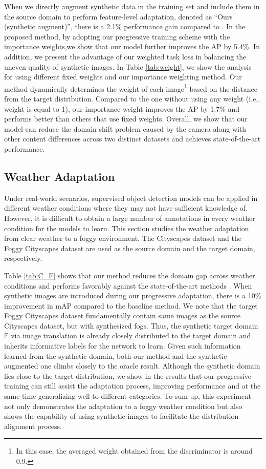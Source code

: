\documentclass[10pt,twocolumn,letterpaper]{article}
\begin{document}
When we directly augment synthetic data in the training set and include them in the source domain to perform feature-level adaptation, denoted as ``Ours (synthetic augment)'', there is a 2.1\% performance gain compared to \cite{chen2018domain}.
In the proposed method, by adopting our progressive training scheme with the importance weights,we show that our model further improves the AP by 5.4\%.
In addition, we present the advantage of our weighted task loss in balancing the uneven quality of synthetic images.
In Table \ref{tab:weight}, we show the analysis for using different fixed weights and our importance weighting method.
Our method dynamically determines the weight of each image\footnote{In this case, the averaged weight obtained from the discriminator is around 0.9.} based on the distance from the target distribution.
Compared to the one without using any weight (i.e., weight is equal to 1), our importance weight improves the AP by 1.7\% and performs better than others that use fixed weights.
Overall, we show that our model can reduce the domain-shift problem caused by the camera along with other content differences across two distinct datasets and achieves state-of-the-art performance.

\subsection{Weather Adaptation} \label{weather}
Under real-world scenarios, supervised object detection models can be applied in different weather conditions where they may not have sufficient knowledge of.
However, it is difficult to obtain a large number of annotations in every weather condition for the models to learn.
This section studies the weather adaptation from clear weather to a foggy environment.
The Cityscapes dataset \cite{Cordts2016Cityscapes} and the Foggy Cityscapes dataset \cite{SDV18} are used as the source domain and the target domain, respectively.


Table \ref{tab:C_F} shows that our method reduces the domain gap across weather conditions and performs favorably against the state-of-the-art methods \cite{chen2018domain,Saito_2019_CVPR,Zhu_2019_CVPR,kim2019diversify}.
When synthetic images are introduced during our progressive adaptation, there is a 10\% improvement in mAP compared to the baseline method.
We note that the target Foggy Cityscapes dataset fundamentally contain same images as the source Cityscapes dataset, but with synthesized fogs.
Thus, the synthetic target domain $\mathbb{F}$ via image translation is already closely distributed to the target domain and inherits informative labels for the network to learn.
Given such information learned from the synthetic domain, both our method and the synthetic augmented one climbs closely to the oracle result.
Although the synthetic domain lies close to the target distribution, we show in the results that our progressive training can still assist the adaptation process, improving performance and at the same time generalizing well to different categories.
To sum up, this experiment not only demonstrates the adaptation to a foggy weather condition but also shows the capability of using synthetic images to facilitate the distribution alignment process.
\end{document}
